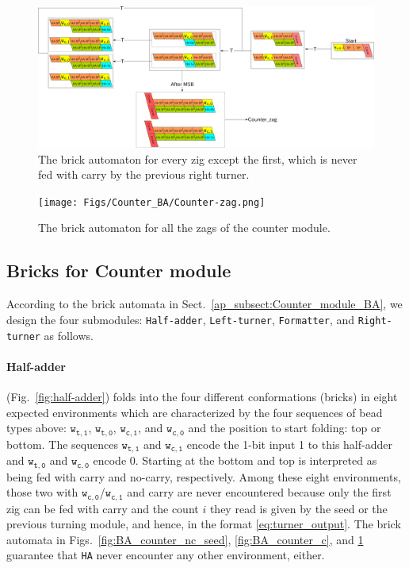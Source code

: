\documentclass[dvipdfmx,review]{elsarticle}
\begin{document}
\begin{figure}[ht]
\centering
\includegraphics[width=\linewidth]{Figs/Counter_BA/Counter-NC_brick.png}
\caption{The brick automaton for every zig except the first, which is never fed with carry by the previous right turner.}
\label{fig:BA_counter_nc}
\end{figure}

\begin{figure}[ht]
\centering
\texttt{[image: Figs/Counter\_BA/Counter-zag.png]}
\caption{The brick automaton for all the zags of the counter module.}
\label{fig:BA_counter_zag}
\end{figure}

\clearpage


	\subsection{Bricks for Counter module}
	\label{ap_subsect:Counter_module_bricks}

According to the brick automata in Sect.~\ref{ap_subsect:Counter_module_BA}, 
we design the four submodules: \texttt{Half-adder}, \texttt{Left-turner}, \texttt{Formatter}, and \texttt{Right-turner} as follows. 

\paragraph{Half-adder} (Fig.~\ref{fig:half-adder}) folds into the four different conformations (bricks) in eight expected environments which are characterized by the four sequences of bead types above: $\mathtt{w_{t, 1}}$, $\mathtt{w_{t, 0}}$, $\mathtt{w_{c, 1}}$, and $\mathtt{w_{c, 0}}$ and the position to start folding: top or bottom. 
The sequences $\mathtt{w_{t, 1}}$ and $\mathtt{w_{c, 1}}$ encode the 1-bit input 1 to this half-adder and $\mathtt{w_{t, 0}}$ and $\mathtt{w_{c, 0}}$ encode 0. 
Starting at the bottom and top is interpreted as being fed with carry and no-carry, respectively. 
Among these eight environments, those two with $\mathtt{w_{c, 0}}$/$\mathtt{w_{c, 1}}$ and carry are never encountered because only the first zig can be fed with carry and the count $i$ they read is given by the seed or the previous turning module, and hence, in the format \eqref{eq:turner_output}. 
The brick automata in Figs.~\ref{fig:BA_counter_nc_seed}, \ref{fig:BA_counter_c}, and \ref{fig:BA_counter_nc} guarantee that \texttt{HA} never encounter any other environment, either. 
\end{document}
